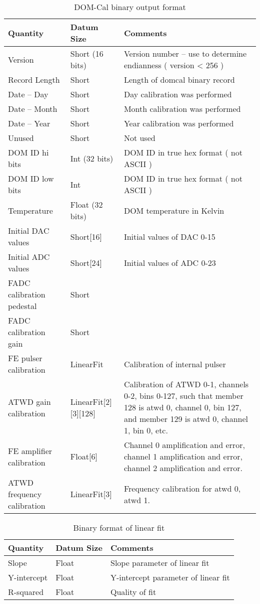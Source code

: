 \documentclass[10pt]{article}
\begin{document}
\begin{table}
\begin{tabular}{|p{4cm}|p{4cm}|p{4cm}|}
\hline
Quantity & Datum Size & Comments \\
\hline
Version & Short (16 bits) & Version number -- use to determine endianness ( version < 256 ) \\
\hline
Record Length & Short & Length of domcal binary record \\
\hline
Date -- Day & Short & Day calibration was performed \\
\hline
Date -- Month & Short & Month calibration was performed \\
\hline
Date -- Year & Short & Year calibration was performed \\
\hline
Unused & Short & Not used \\
\hline
DOM ID hi bits & Int (32 bits) & DOM ID in true hex format ( not ASCII ) \\
\hline
DOM ID low bits & Int & DOM ID in true hex format ( not ASCII ) \\
\hline
Temperature & Float (32 bits) & DOM temperature in Kelvin \\
\hline
Initial DAC values & Short[16] & Initial values of DAC 0-15 \\
\hline
Initial ADC values & Short[24] & Initial values of ADC 0-23 \\
\hline
FADC calibration pedestal & Short & \\
\hline
FADC calibration gain & Short & \\
\hline
FE pulser calibration & LinearFit & Calibration of internal pulser \\
\hline
ATWD gain calibration & LinearFit[2][3][128] & Calibration of 
ATWD 0-1, channels 0-2, bins 0-127,
such that member 128 is atwd 0, channel 0, bin 127,
and member 129 is atwd 0, channel 1, bin 0, etc. \\
\hline
FE amplifier calibration & Float[6] & Channel 0 amplification and error,
channel 1 amplification and error, channel 2 amplification and error. \\
\hline
ATWD frequency calibration & LinearFit[3] & Frequency calibration for atwd 0, atwd 1. \\
\hline
\end{tabular}
\caption{DOM-Cal binary output format}
\label{tbl:binary}
\end{table}

\begin{table}
\begin{tabular}{|p{4cm}|p{4cm}|p{4cm}|}
\hline
Quantity & Datum Size & Comments \\
\hline
Slope & Float & Slope parameter of linear fit \\
\hline
Y-intercept & Float & Y-intercept parameter of linear fit \\
\hline
R-squared & Float & Quality of fit \\
\hline
\end{tabular}
\caption{Binary format of linear fit}
\label{tbl:linearfit}
\end{table}
\end{document}

